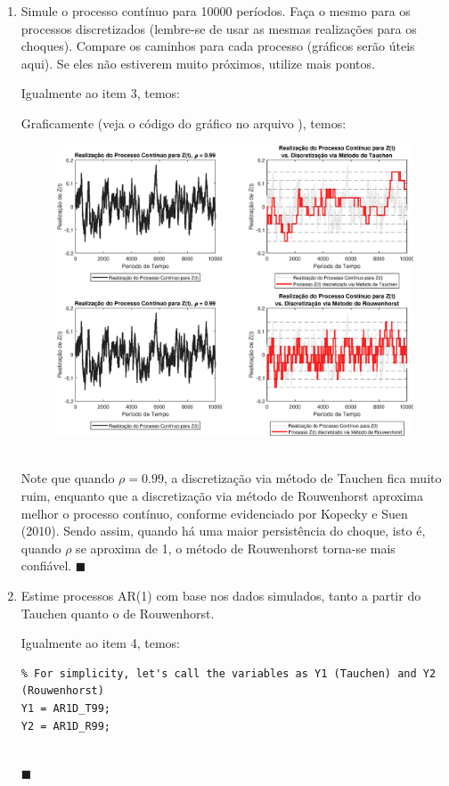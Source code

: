 \documentclass[10pt]{article}
\newcommand*{\QEDA}{\hfill\ensuremath{\blacksquare}}%
\newcommand\0{\mathbf{0}}
\newenvironment{sol}
    {\\[1em] {\color{magenta}\text{Resposta.}}
    }
    {{\color{blue!50!black}\QEDA}}
\begin{document}
\begin{enumerate}[label = 5.\arabic*., wide]
\item Simule o processo contínuo para 10000 períodos. Faça o mesmo para os
processos discretizados (lembre-se de usar as mesmas realizações para
os choques). Compare os caminhos para cada processo (gráficos serão
úteis aqui). Se eles não estiverem muito próximos, utilize mais pontos.
\begin{sol}
Igualmente ao item 3, temos:  

\newpage
Graficamente (veja o código do gráfico no arquivo ), temos:
\begin{figure}[htp!]
\centering
	\includegraphics[scale=0.63]{myfig1.eps}
\end{figure}\\
Note que quando $\rho = 0.99$, a discretização via método de Tauchen fica muito ruim, enquanto que a discretização via método de Rouwenhorst aproxima melhor o processo contínuo, conforme evidenciado por Kopecky e Suen (2010). Sendo assim, quando há uma maior persistência do choque, isto é, quando $\rho$ se aproxima de 1, o método de Rouwenhorst torna-se mais confiável.
\end{sol}
\item Estime processos AR(1) com base nos dados simulados, tanto a partir
do Tauchen quanto o de Rouwenhorst.
\begin{sol}
Igualmente ao item 4, temos: 
\begin{lstlisting}
% For simplicity, let's call the variables as Y1 (Tauchen) and Y2 (Rouwenhorst)
Y1 = AR1D_T99;
Y2 = AR1D_R99;


\end{lstlisting}
\end{sol}
\end{enumerate}
\end{document}
